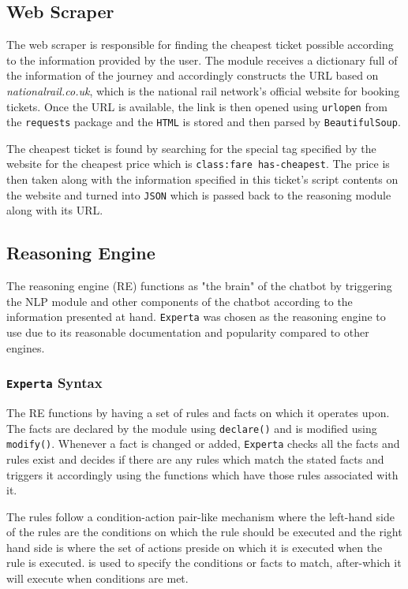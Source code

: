 \documentclass[11pt]{article}
\newcommand{\code}[1]{{\texttt{#1}}}
\begin{document}
    \subsection{Web Scraper}
    The web scraper is responsible for finding the cheapest ticket possible according to the information provided by the user. The module receives a dictionary full of the information of the journey and accordingly constructs the URL based on \textit{nationalrail.co.uk}, which is the national rail network's official website for booking tickets. Once the URL is available, the link is then opened using \code{urlopen} from the \code{requests} package and the \code{HTML} is stored and then parsed by \code{BeautifulSoup}. 
    
    The cheapest ticket is found by searching for the special tag specified by the website for the cheapest price which is \code{class:fare has-cheapest}. The price is then taken along with the information specified in this ticket's script contents on the website and turned into \code{JSON} which is passed back to the reasoning module along with its URL.


    \subsection{Reasoning Engine}\label{sec:ReasoningDesign}
    The reasoning engine (RE) functions as "the brain" of the chatbot by triggering the NLP module and other components of the chatbot according to the information presented at hand. \code{Experta} was chosen as the reasoning engine to use due to its reasonable documentation and popularity compared to other engines.
    
        \subsubsection{\code{Experta} Syntax}
        The RE functions by having a set of rules and facts on which it operates upon. The facts are declared by the module using \code{declare()} and is modified using \code{modify()}. Whenever a fact is changed or added, \code{Experta} checks all the facts and rules exist and decides if there are any rules which match the stated facts and triggers it accordingly using the functions which have those rules associated with it.
        
        The rules follow a condition-action pair-like mechanism where the left-hand side of the rules are the conditions on which the rule should be executed and the right hand side is where the set of actions preside on which it is executed when the rule is executed. \code{\@Rule} is used to specify the conditions or facts to match, after-which it will execute when conditions are met.
        
\end{document}

